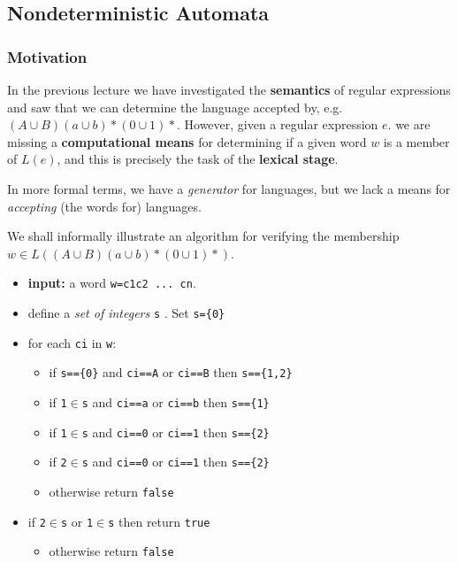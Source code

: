 \documentclass[a4paper, 12pt]{article}
\begin{document}
\subsection{ Nondeterministic Automata }

\subsubsection{ Motivation }

In the previous lecture we have investigated the \textbf{semantics} of regular expressions and saw that we can determine the language accepted by, e.g. $(A\cup B)(a\cup b)*(0 \cup 1)*$. However, given a regular expression $e$. we are missing a \textbf{computational means} for determining if a given word $w$ is a member of $L(e)$, and this is precisely the task of the \textbf{lexical stage}.

In more formal terms, we have a \textit{generator} for languages, but we lack a means for \textit{accepting} (the words for) languages.

We shall informally illustrate an algorithm for verifying the membership $w \in L((A\cup B)(a\cup b)*(0 \cup 1)*)$.
  \begin{itemize}
  	\item  \textbf{input:} a word \texttt{w=c1c2 ... cn}.
  	\item  define a \textit{set of integers} \texttt{s} . Set \texttt{s=\{0\}}
  	\item  for each \texttt{ci} in \texttt{w}:

    \begin{itemize}
    	\item  if \texttt{s==\{0\}} and \texttt{ci==A} or \texttt{ci==B} then \texttt{s==\{1,2\}}
    	\item  if \texttt{1}$\in$\texttt{s} and \texttt{ci==a} or \texttt{ci==b} then \texttt{s==\{1\}}
    	\item  if \texttt{1}$\in$\texttt{s} and \texttt{ci==0} or \texttt{ci==1} then \texttt{s==\{2\}}
    	\item  if \texttt{2}$\in$\texttt{s} and \texttt{ci==0} or \texttt{ci==1} then \texttt{s==\{2\}}
    	\item  otherwise return \texttt{false}
    \end{itemize}
  	\item  if \texttt{2}$\in$\texttt{s} or \texttt{1}$\in$\texttt{s} then return \texttt{true}

    \begin{itemize}
    	\item  otherwise return \texttt{false}
    \end{itemize}
  \end{itemize}
\end{document}
